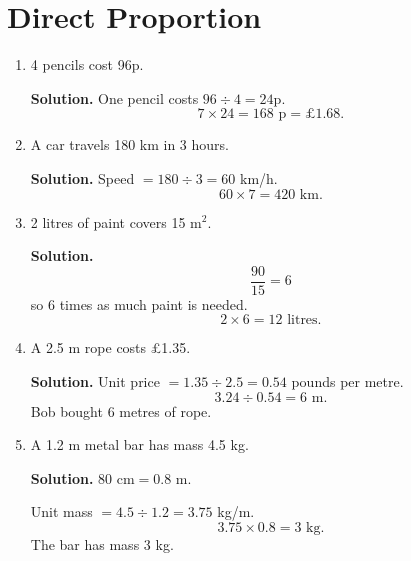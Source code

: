\documentclass[12pt,a4paper]{article}
\begin{document}
\section*{Direct Proportion}
\begin{enumerate}
\item 4 pencils cost 96p.

\textbf{Solution.} One pencil costs \(96\div4=24\)p.
\[
7\times24=168\text{ p}=\pounds1.68.
\]

\item A car travels 180 km in 3 hours.

\textbf{Solution.} Speed \(=180\div3=60\) km/h.
\[
60\times7=420\text{ km}.
\]

\item 2 litres of paint covers 15 m\(^2\).

\textbf{Solution.}
\[
\frac{90}{15}=6
\]
so 6 times as much paint is needed.
\[
2\times6=12\text{ litres}.
\]

\item A 2.5 m rope costs \pounds1.35.

\textbf{Solution.} Unit price \(=1.35\div2.5=0.54\) pounds per metre.
\[
3.24\div0.54=6\text{ m}.
\]
Bob bought \(6\) metres of rope.

\item A 1.2 m metal bar has mass 4.5 kg.

\textbf{Solution.} \(80\text{ cm}=0.8\text{ m}\).

Unit mass \(=4.5\div1.2=3.75\) kg/m.
\[
3.75\times0.8=3\text{ kg}.
\]
The bar has mass \(3\) kg.
\end{enumerate}
\end{document}
